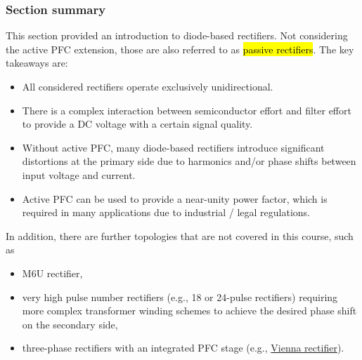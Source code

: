 \begin{frame}
	\frametitle{Section summary}
	This section provided an introduction to diode-based rectifiers. Not considering the active PFC extension, those are also referred to as \hl{passive rectifiers}. \pause The key takeaways are:
	\begin{itemize}
		\item All considered rectifiers operate exclusively unidirectional.\pause
		\item There is a complex interaction between semiconductor effort and filter effort to provide a DC voltage with a certain signal quality.\pause
		\item Without active PFC, many diode-based rectifiers introduce significant distortions at the primary side due to harmonics and/or phase shifts between input voltage and current.\pause
		\item Active PFC can be used to provide a near-unity power factor, which is required in many applications due to industrial / legal regulations.\pause
	\end{itemize}
	In addition, there are further topologies that are not covered in this course, such as
	\begin{itemize}
		\item M6U rectifier,
		\item very high pulse number rectifiers (e.g., 18 or 24-pulse rectifiers) requiring more complex transformer winding schemes to achieve the desired phase shift on the secondary side,
		\item three-phase rectifiers with an integrated PFC stage (e.g., \href{https://en.wikipedia.org/wiki/Vienna_rectifier}{Vienna rectifier}).
	\end{itemize}
\end{frame}